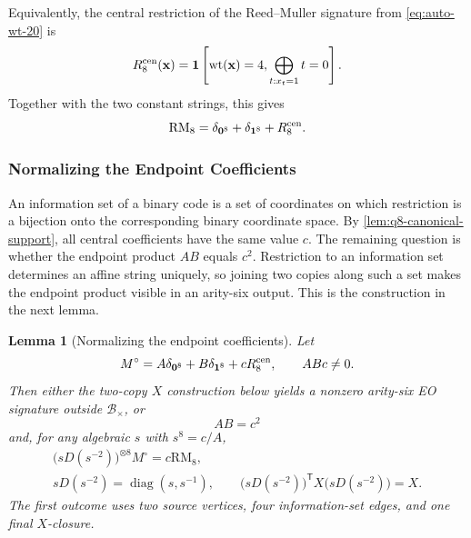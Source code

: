 \documentclass[11pt,letterpaper,onecolumn]{article}
\theoremstyle{plain}
\newtheorem{lemma}[lemma]{Lemma}
\theoremstyle{definition}
\theoremstyle{remark}
\newcommand{\diag}{\operatorname{diag}}
\newcommand{\wt}{\operatorname{wt}}
\newcommand{\one}{\mathbf 1}
\newcommand{\zero}{\mathbf 0}
\newcommand{\RMcore}{\mathrm{RM}_8}
\begin{document}
	Equivalently, the central restriction of the Reed--Muller signature from \eqref{eq:auto-wt-20} is
	\[
	R_8^{\rm cen}({\mathbf x})
	=\one\left[\wt({\mathbf x})=4,
	\bigoplus_{t:x_t=1}t=0\right].
	\]
    Together with the two constant strings, this gives
    \[
    \RMcore=\delta_{\zero^8}+\delta_{\one^8}+R_8^{\rm cen}.
    \]

	
	\subsubsection{Normalizing the Endpoint Coefficients}
	
	An information set of a binary code is a set of coordinates on which
	restriction is a bijection onto the corresponding binary coordinate space.
	By \cref{lem:q8-canonical-support}, all central coefficients have the
same value \(c\). The remaining question is whether the endpoint product
\(AB\) equals \(c^2\).  Restriction to an
information set determines an affine string uniquely, so joining two
copies along such a set makes the endpoint product visible in an arity-six
output.  This is the construction in the next lemma.
	
	\begin{lemma}[Normalizing the endpoint coefficients]
		\label{lem:q8-canonical-endpoint-repair}
		Let
		\[
		M^\circ=A\delta_{\zero^8}+B\delta_{\one^8}+cR_8^{\rm cen},
		\qquad ABc\ne0.
		\]
		Then either the two-copy \(X\) construction below yields a nonzero
		arity-six EO signature outside
		\(\mathcal B_\times\), or
		\begin{equation}
		AB=c^2
		\label{eq:q8-canonical-endpoint}
		\end{equation}
		and, for any algebraic \(s\) with \(s^8=c/A\),
		\begin{equation}
		\begin{gathered}
		\bigl(sD(s^{-2})\bigr)^{\otimes8}M^\circ=c\RMcore,\\
		sD(s^{-2})=\diag(s,s^{-1}),
		\qquad
		\bigl(sD(s^{-2})\bigr)^{\mathsf T}X\bigl(sD(s^{-2})\bigr)=X.
		\end{gathered}
		\label{eq:q8-canonical-normalization}
		\end{equation}
		The first outcome uses two source vertices, four information-set edges, and
		one final \(X\)-closure.
	\end{lemma}
	
\end{document}
